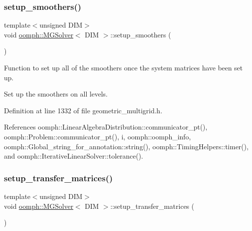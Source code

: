 \mbox{\label{classoomph_1_1MGSolver_a9b3674f92da65b8cacada47325107804}} 
\subsubsection{\texorpdfstring{setup\+\_\+smoothers()}{setup\_smoothers()}}
{\footnotesize\ttfamily template$<$unsigned D\+IM$>$ \\
void \hyperlink{classoomph_1_1MGSolver}{oomph\+::\+M\+G\+Solver}$<$ D\+IM $>$\+::setup\+\_\+smoothers (\begin{DoxyParamCaption}{ }\end{DoxyParamCaption})\hspace{0.3cm}{\ttfamily [private]}}



Function to set up all of the smoothers once the system matrices have been set up. 

Set up the smoothers on all levels. 

Definition at line 1332 of file geometric\+\_\+multigrid.\+h.



References oomph\+::\+Linear\+Algebra\+Distribution\+::communicator\+\_\+pt(), oomph\+::\+Problem\+::communicator\+\_\+pt(), i, oomph\+::oomph\+\_\+info, oomph\+::\+Global\+\_\+string\+\_\+for\+\_\+annotation\+::string(), oomph\+::\+Timing\+Helpers\+::timer(), and oomph\+::\+Iterative\+Linear\+Solver\+::tolerance().

\mbox{\label{classoomph_1_1MGSolver_a332a6b1028732481a4954fa0a9337a80}} 
\subsubsection{\texorpdfstring{setup\+\_\+transfer\+\_\+matrices()}{setup\_transfer\_matrices()}}
{\footnotesize\ttfamily template$<$unsigned D\+IM$>$ \\
void \hyperlink{classoomph_1_1MGSolver}{oomph\+::\+M\+G\+Solver}$<$ D\+IM $>$\+::setup\+\_\+transfer\+\_\+matrices (\begin{DoxyParamCaption}{ }\end{DoxyParamCaption})}



